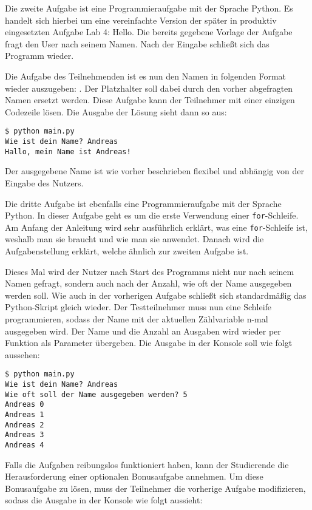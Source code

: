 Die zweite Aufgabe ist eine Programmieraufgabe mit der Sprache Python. Es
handelt sich hierbei um eine vereinfachte Version der später in produktiv
eingesetzten Aufgabe \glqq Lab 4: Hello\grqq{}. Die bereits gegebene Vorlage der
Aufgabe fragt den User nach seinem Namen. Nach der Eingabe schließt sich das
Programm wieder. \parencite{git-repo:first-loop}

Die Aufgabe des Teilnehmenden ist es nun den Namen in folgenden
Format wieder auszugeben: . Der Platzhalter
 soll dabei durch den vorher abgefragten Namen ersetzt werden.
Diese Aufgabe kann der Teilnehmer mit einer einzigen Codezeile lösen. Die
Ausgabe der Lösung sieht dann so aus:

\begin{lstlisting}[style=Bash]
$ python main.py
Wie ist dein Name? Andreas
Hallo, mein Name ist Andreas!
\end{lstlisting}

Der ausgegebene Name ist wie vorher beschrieben flexibel und abhängig von der
Eingabe des Nutzers.

Die dritte Aufgabe ist ebenfalls eine Programmieraufgabe mit der Sprache Python.
In dieser Aufgabe geht es um die erste Verwendung einer \texttt{for}-Schleife.
Am Anfang der Anleitung wird sehr ausführlich erklärt, was eine
\texttt{for}-Schleife ist, weshalb man sie braucht und wie man sie anwendet.
Danach wird die Aufgabenstellung erklärt, welche ähnlich zur zweiten Aufgabe
ist. \parencite{git-repo:first-loop}

Dieses Mal wird der Nutzer nach Start des Programms nicht nur nach seinem
Namen gefragt, sondern auch nach der Anzahl, wie oft der Name ausgegeben werden
soll. Wie auch in der vorherigen Aufgabe schließt sich standardmäßig das
Python-Skript gleich wieder. Der Testteilnehmer muss nun eine Schleife
programmieren, sodass der Name mit der aktuellen Zählvariable n-mal ausgegeben
wird. Der Name und die Anzahl an Ausgaben wird wieder per Funktion als Parameter
übergeben. Die Ausgabe in der Konsole soll wie folgt aussehen:

\begin{lstlisting}[style=Bash]
$ python main.py
Wie ist dein Name? Andreas
Wie oft soll der Name ausgegeben werden? 5
Andreas 0
Andreas 1
Andreas 2
Andreas 3
Andreas 4
\end{lstlisting}

\newpage

Falls die Aufgaben reibungslos funktioniert haben, kann der Studierende
die Herausforderung einer optionalen Bonusaufgabe annehmen. Um diese
Bonusaufgabe zu lösen, muss der Teilnehmer die vorherige Aufgabe modifizieren,
sodass die Ausgabe in der Konsole wie folgt aussieht:

